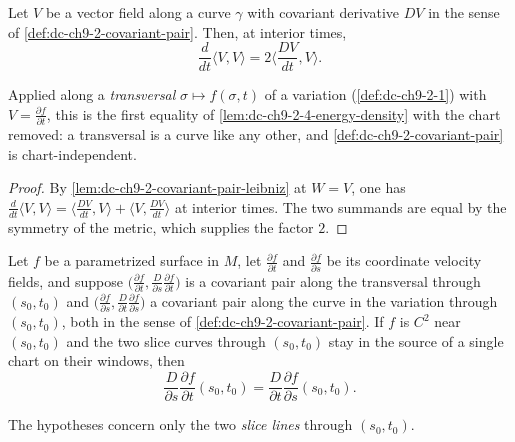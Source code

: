 \begin{lemma}
  \label{lem:dc-ch9-2-4-density-self}


  Let $V$ be a vector field along a curve $\gamma$ with covariant derivative $DV$ in the
  sense of \cref{def:dc-ch9-2-covariant-pair}. Then, at interior times,
  $$
  \frac{d}{dt}\langle V,V\rangle = 2\Big\langle\frac{DV}{dt},V\Big\rangle.
  $$

  Applied along a \emph{transversal} $\sigma\mapsto f(\sigma,t)$ of a variation
  (\cref{def:dc-ch9-2-1}) with $V=\frac{\partial f}{\partial t}$, this is the first
  equality of \cref{lem:dc-ch9-2-4-energy-density} with the chart removed: a transversal is
  a curve like any other, and \cref{def:dc-ch9-2-covariant-pair} is chart-independent.
\end{lemma}
\begin{proof}

  \sketch
  By \cref{lem:dc-ch9-2-covariant-pair-leibniz} at $W=V$, one has
  $\frac{d}{dt}\langle V,V\rangle
  =\langle\frac{DV}{dt},V\rangle+\langle V,\frac{DV}{dt}\rangle$ at interior times. The two
  summands are equal by the symmetry of the metric, which supplies the factor $2$.

\end{proof}
\begin{lemma}
  \label{lem:dc-ch9-2-4-symmetry-manifold}


  Let $f$ be a parametrized surface in $M$, let $\frac{\partial f}{\partial t}$ and
  $\frac{\partial f}{\partial s}$ be its coordinate velocity fields, and suppose
  $\big(\frac{\partial f}{\partial t},\frac{D}{\partial s}\frac{\partial f}{\partial t}\big)$
  is a covariant pair along the transversal through $(s_0,t_0)$ and
  $\big(\frac{\partial f}{\partial s},\frac{D}{\partial t}\frac{\partial f}{\partial s}\big)$
  a covariant pair along the curve in the variation through $(s_0,t_0)$, both in the sense
  of \cref{def:dc-ch9-2-covariant-pair}. If $f$ is $C^2$ near $(s_0,t_0)$ and the two slice
  curves through $(s_0,t_0)$ stay in the source of a single chart on their windows, then
  $$
  \frac{D}{\partial s}\frac{\partial f}{\partial t}(s_0,t_0)
    = \frac{D}{\partial t}\frac{\partial f}{\partial s}(s_0,t_0).
  $$

  The hypotheses concern only the two \emph{slice lines} through $(s_0,t_0)$.
\end{lemma}
